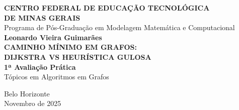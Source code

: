 \documentclass[12pt,a4paper]{article}
\begin{document}
\begin{titlepage}
    \centering
    \vspace*{1.5cm}
    
    {\fontsize{12}{14}\selectfont\textbf{CENTRO FEDERAL DE EDUCAÇÃO TECNOLÓGICA\\DE MINAS GERAIS}}\\[0.3cm]
    {\fontsize{12}{14}\selectfont Programa de Pós-Graduação em Modelagem Matemática e Computacional}\\[2cm]
    
    {\fontsize{12}{14}\selectfont\textbf{Leonardo Vieira Guimarães}}\\[2.5cm]
    
    {\fontsize{12}{14}\selectfont\textbf{CAMINHO MÍNIMO EM GRAFOS:\\DIJKSTRA VS HEURÍSTICA GULOSA}}\\[0.8cm]
    
    {\fontsize{12}{14}\selectfont\textbf{1ª Avaliação Prática}}\\[0.8cm]
    
    {\fontsize{12}{14}\selectfont Tópicos em Algoritmos em Grafos}\\[3cm]
    
    \vfill
    
    {\fontsize{12}{14}\selectfont Belo Horizonte}\\
    {\fontsize{12}{14}\selectfont Novembro de 2025}
\end{titlepage}

\newpage
\thispagestyle{empty}
\end{document}
